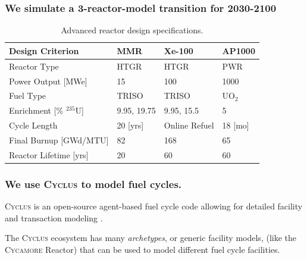 \documentclass[9pt]{beamer}
\newcommand{\cycamore}{\textsc{Cycamore}\xspace}
\newcommand{\cyclus}{\textsc{Cyclus}\xspace}
\begin{document}
  \begin{frame}
    \frametitle{We simulate a 3-reactor-model transition for 2030-2100}
    \begin{table}[H]
      \centering
      \caption{Advanced reactor design specifications.}
      \label{tab:ar_defs}
      \begin{tabular}{l l l l}
         \hline
         \textbf{Design Criterion} & \textbf{MMR} \cite{usnc_design_2021} & \textbf{Xe-100} \cite{nuscale_chapter_2018} & \textbf{AP1000} \\
         \hline
         Reactor Type & HTGR & HTGR & PWR \\
         Power Output [MWe] & 15 & 100 & 1000 \\
         Fuel Type & TRISO & TRISO & UO$_2$ \\
         Enrichment [\% $^{235}$U] & 9.95, 19.75 & 9.95, 15.5 & 5 \\
         Cycle Length & 20 [yrs] & Online Refuel & 18 [mo] \\
         Final Burnup [GWd/MTU] & 82 & 168 & 65 \\
         Reactor Lifetime [yrs] & 20 & 60 & 60 \\
         \hline
      \end{tabular}
   \end{table}
  \end{frame}

  \begin{frame}
    \frametitle{We use \cyclus to model fuel cycles.}
    \vspace{10pt}
    \cyclus is an open-source agent-based fuel cycle code allowing for detailed facility and transaction modeling \cite{huff_fundamental_2016}.
    \begin{center}
    \end{center} %

    The \cyclus ecosystem has many \textit{archetypes}, or generic facility models, (like the \cycamore Reactor) that can be used to model different fuel cycle facilities.
    \end{frame}
\end{document}
